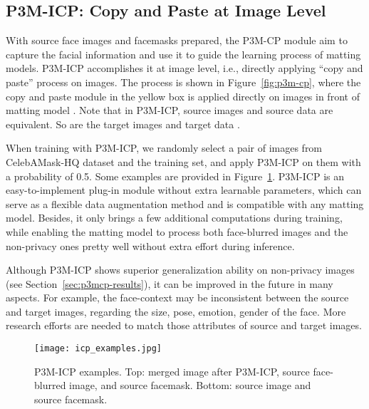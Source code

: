 \documentclass[twocolumn]{svjour3}
\begin{document}
\subsection{P3M-ICP: Copy and Paste at Image Level}
With source face images and facemasks prepared, the P3M-CP module aim to capture the facial information and use it to guide the learning process of matting models. P3M-ICP accomplishes it at image level, i.e., directly applying ``copy and paste'' process on images. The process is shown in Figure~\ref{fig:p3m-cp}, where the copy and paste module in the yellow box is applied directly on images in front of matting model . Note that in P3M-ICP, source images  and source data  are equivalent. So are the target images  and target data .


When training with P3M-ICP, we randomly select a pair of images from CelebAMask-HQ dataset and the training set, and apply P3M-ICP on them with a probability of 0.5. Some examples are provided in Figure~\ref{fig:data-cp-examples}. P3M-ICP is an easy-to-implement plug-in module without extra learnable parameters, which can serve as a flexible data augmentation method and is compatible with any matting model. Besides, it only brings a few additional computations during training, while enabling the matting model to process both face-blurred images and the non-privacy ones pretty well without extra effort during inference.

Although P3M-ICP shows superior generalization ability on non-privacy images (see Section~\ref{sec:p3mcp-results}), it can be improved in the future in many aspects. For example, the face-context may be inconsistent between the source and target images, regarding the size, pose, emotion, gender of the face. More research efforts are needed to match those attributes of source and target images.


\begin{figure}
    \centering
    \texttt{[image: icp\_examples.jpg]}
    \caption{P3M-ICP examples. Top: merged image after P3M-ICP, source face-blurred image, and source facemask. Bottom: source image and source facemask.}
    \label{fig:data-cp-examples}
\end{figure}
\end{document}
